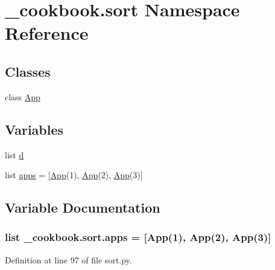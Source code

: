 \hypertarget{namespace__cookbook_1_1sort}{\section{\-\_\-cookbook.\-sort Namespace Reference}
\label{namespace__cookbook_1_1sort}
}
\subsection*{Classes}
\begin{DoxyCompactItemize}
\item 
class \hyperlink{class__cookbook_1_1sort_1_1App}{App}
\end{DoxyCompactItemize}
\subsection*{Variables}
\begin{DoxyCompactItemize}
\item 
list \hyperlink{namespace__cookbook_1_1sort_a75232840573a2c0ea5f03c47fc06f540}{d}
\item 
list \hyperlink{namespace__cookbook_1_1sort_a0f8929d439af8acc1f7c8beb0c62bc91}{apps} = \mbox{[}\hyperlink{class__cookbook_1_1sort_1_1App}{App}(1), \hyperlink{class__cookbook_1_1sort_1_1App}{App}(2), \hyperlink{class__cookbook_1_1sort_1_1App}{App}(3)\mbox{]}
\end{DoxyCompactItemize}


\subsection{Variable Documentation}
\hypertarget{namespace__cookbook_1_1sort_a0f8929d439af8acc1f7c8beb0c62bc91}{
\subsubsection[{apps}]{\setlength{\rightskip}{0pt plus 5cm}list \-\_\-cookbook.\-sort.\-apps = \mbox{[}{\bf App}(1), {\bf App}(2), {\bf App}(3)\mbox{]}}}\label{namespace__cookbook_1_1sort_a0f8929d439af8acc1f7c8beb0c62bc91}


Definition at line 97 of file sort.\-py.

